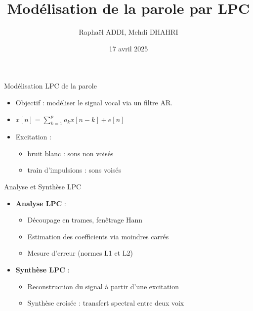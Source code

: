 \documentclass{beamer}
\title{Modélisation de la parole par LPC}
\author{Raphaël ADDI, Mehdi DHAHRI}
\institute{INSA Toulouse – Département 3MIC}
\date{17 avril 2025}
\begin{document}
\begin{frame}
  \titlepage
\end{frame}

\begin{frame}{Modélisation LPC de la parole}
  \begin{itemize}
    \item Objectif : modéliser le signal vocal via un filtre AR.
    \item \( x[n] = \sum_{k=1}^{p} a_k x[n-k] + e[n] \)
    \item Excitation :
    \begin{itemize}
        \item bruit blanc : sons non voisés
        \item train d’impulsions : sons voisés
    \end{itemize}
  \end{itemize}
\end{frame}

\begin{frame}{Analyse et Synthèse LPC}
  \begin{itemize}
    \item \textbf{Analyse LPC} :
    \begin{itemize}
        \item Découpage en trames, fenêtrage Hann
        \item Estimation des coefficients via moindres carrés
        \item Mesure d’erreur (normes L1 et L2)
    \end{itemize}
    \item \textbf{Synthèse LPC} :
    \begin{itemize}
        \item Reconstruction du signal à partir d’une excitation
        \item Synthèse croisée : transfert spectral entre deux voix
    \end{itemize}
  \end{itemize}
\end{frame}
\end{document}
